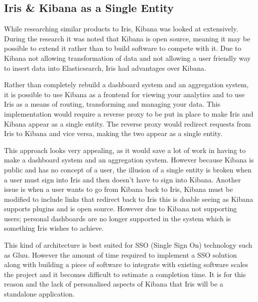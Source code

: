 \documentclass[12pt,a4paper,titlepage]{report}
\begin{document}
\begin{appendices}
\section{Iris \& Kibana as a Single Entity}

While researching similar products to Iris, Kibana was looked at extensively. During the research it was noted that Kibana is open source, meaning it may be possible to extend it rather than to build software to compete with it. Due to Kibana not allowing transformation of data and not allowing a user friendly way to insert data into Elasticsearch, Iris had advantages over Kibana. 

Rather than completely rebuild a dashboard system and an aggregation system, it is possible to use Kibana as a frontend for viewing your analytics and to use Iris as a means of routing, transforming and managing your data. This implementation would require a reverse proxy to be put in place to make Iris and Kibana appear as a single entity. The reverse proxy would redirect requests from Iris to Kibana and vice versa, making the two appear as a single entity.

This approach looks very appealing, as it would save a lot of work in having to make a dashboard system and an aggregation system. However because Kibana is public and has no concept of a user, the illusion of a single entity is broken when a user must sign into Iris and then doesn’t have to sign into Kibana. Another issue is when a user wants to go from Kibana back to Iris, Kibana must be modified to include links that redirect back to Iris this is doable seeing as Kibana supports plugins and is open source. However due to Kibana not supporting users; personal dashboards are no longer supported in the system which is something Iris wishes to achieve.

This kind of architecture is best suited for SSO (Single Sign On) technology such as Gluu. However the amount of  time required to implement a SSO solution along with building a piece of software to integrate with existing software scales the project and it becomes difficult to estimate a completion time. It is for this reason and the lack of personalised aspects of Kibana that Iris will be a standalone application.


\end{appendices}
\end{document}
